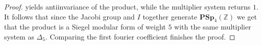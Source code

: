 \documentclass[9pt]{amsart} \usepackage[utf8]{inputenc}
\newcommand{\Z}{\mathbb{Z}} \newcommand{\C}{\mathbb{C}}
\newcommand{\PSp}{\mathbf{PSp}}
\begin{document}
\begin{proof}
  yields antiinvariance  of the product, while the multiplier system
  returns $1$. It follows that since the Jacobi group and $I$ together
  generate $\PSp_4(\Z)$ we get that the product is a Siegel modular form
  of weight $5$ with the same multiplier system as $\Delta_5$. Comparing
  the first fourier coefficient finishes the proof.


\end{proof}




\end{document}
